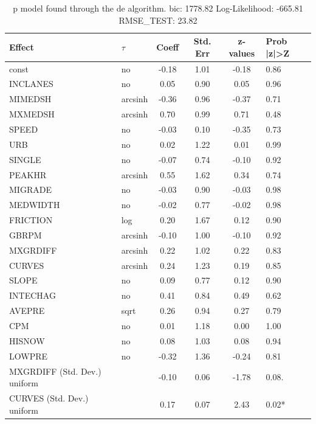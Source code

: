 \begin{table}
	\caption{p model found through the de algorithm. bic: 1778.82 Log-Likelihood: -665.81 RMSE_TEST: 23.82}
	\begin{center}
		\begin{tabular}{|l|l|c|c|c|l|}
			\hline
			Effect & $\tau$ & Coeff & Std. Err & z-values & Prob |z|>Z \\
			\hline
			const & no & -0.18 & 1.01 & -0.18 & 0.86 \\
			\hline
			INCLANES & no & 0.05 & 0.90 & 0.05 & 0.96 \\
			\hline
			MIMEDSH & arcsinh & -0.36 & 0.96 & -0.37 & 0.71 \\
			\hline
			MXMEDSH & arcsinh & 0.70 & 0.99 & 0.71 & 0.48 \\
			\hline
			SPEED & no & -0.03 & 0.10 & -0.35 & 0.73 \\
			\hline
			URB & no & 0.02 & 1.22 & 0.01 & 0.99 \\
			\hline
			SINGLE & no & -0.07 & 0.74 & -0.10 & 0.92 \\
			\hline
			PEAKHR & arcsinh & 0.55 & 1.62 & 0.34 & 0.74 \\
			\hline
			MIGRADE & no & -0.03 & 0.90 & -0.03 & 0.98 \\
			\hline
			MEDWIDTH & no & -0.02 & 0.77 & -0.02 & 0.98 \\
			\hline
			FRICTION & log & 0.20 & 1.67 & 0.12 & 0.90 \\
			\hline
			GBRPM & arcsinh & -0.10 & 1.00 & -0.10 & 0.92 \\
			\hline
			MXGRDIFF & arcsinh & 0.22 & 1.02 & 0.22 & 0.83 \\
			\hline
			CURVES & arcsinh & 0.24 & 1.23 & 0.19 & 0.85 \\
			\hline
			SLOPE & no & 0.09 & 0.77 & 0.12 & 0.90 \\
			\hline
			INTECHAG & no & 0.41 & 0.84 & 0.49 & 0.62 \\
			\hline
			AVEPRE & sqrt & 0.26 & 0.94 & 0.27 & 0.79 \\
			\hline
			CPM & no & 0.01 & 1.18 & 0.00 & 1.00 \\
			\hline
			HISNOW & no & 0.08 & 1.03 & 0.08 & 0.94 \\
			\hline
			LOWPRE & no & -0.32 & 1.36 & -0.24 & 0.81 \\
			\hline
			MXGRDIFF (Std. Dev.) uniform &  & -0.10 & 0.06 & -1.78 & 0.08. \\
			\hline
			CURVES (Std. Dev.) uniform &  & 0.17 & 0.07 & 2.43 & 0.02* \\

\end{tabular}
\end{center}
\end{table}
